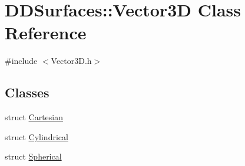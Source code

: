 \hypertarget{class_d_d_surfaces_1_1_vector3_d}{
\section{DDSurfaces::Vector3D Class Reference}
\label{class_d_d_surfaces_1_1_vector3_d}
}


{\ttfamily \#include $<$Vector3D.h$>$}\subsection*{Classes}
\begin{DoxyCompactItemize}
\item 
struct \hyperlink{struct_d_d_surfaces_1_1_vector3_d_1_1_cartesian}{Cartesian}
\item 
struct \hyperlink{struct_d_d_surfaces_1_1_vector3_d_1_1_cylindrical}{Cylindrical}
\item 
struct \hyperlink{struct_d_d_surfaces_1_1_vector3_d_1_1_spherical}{Spherical}
\end{DoxyCompactItemize}

